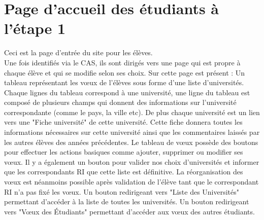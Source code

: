 \section{Page d'accueil des étudiants à l'étape 1}

Ceci est la page d'entrée du site pour les élèves.\\
Une fois identifiés via le CAS, ils sont dirigés vers une page qui est propre à chaque élève et qui se modifie selon ses choix.
Sur cette page est présent :
\bigbreak
Un tableau représentant les vœux de l'élèves sous forme d'une liste d'universités.
Chaque lignes du tableau correspond à une université, une ligne du tableau est composé de plusieurs champs qui donnent des informations sur l'université correspondante (comme le pays, la ville etc).
De plus chaque université est un lien vers une "Fiche université" de cette université. Cette fiche donnera toutes les informations nécessaires sur cette université ainsi que les commentaires laissés par les autres élèves des années précédentes.
Le tableau de vœux possède des boutons pour effectuer les actions basiques comme ajouter, supprimer ou modifier ses vœux. Il y a également un bouton pour valider nos choix d'universités et informer que les correspondants RI que cette liste est définitive. La réorganisation des vœux est néanmoins possible après validation de l'élève tant que le correspondant RI n'a pas fixé les vœux.
\bigbreak
Un bouton redirigeant vers "Liste des Universités" permettant d'accéder à la liste de toutes les universités.
\bigbreak
Un bouton redirigeant vers "Vœux des Étudiants" permettant d'accéder aux vœux des autres étudiants.
